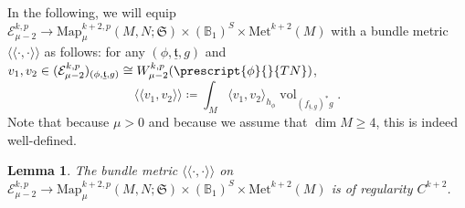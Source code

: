 \documentclass{article}
\numberwithin{equation}{section}        %
\theoremstyle{bfnote}
\newtheorem{lem}[thm]{Lemma}                %
\theoremstyle{definition}
\theoremstyle{bfremark}
\newcommand{\Map}{\mathrm{Map}}             %
\newcommand{\Met}{\mathrm{Met}}             %
\newcommand{\pairl}{\langle \! \langle}     %
\newcommand{\pairr}{\rangle \! \rangle}     %
\DeclareMathOperator{\vol}{vol}                 %
\begin{document}
In the following, we will equip $\mathcal{E}^{k,p}_{\mu-2} \to \Map^{k+2,p}_{\mu}(M,N;\mathfrak{S}) \times (\mathbb{B}_1)^S\times \Met^{k+2}(M)$ with a bundle metric $\pairl \cdot,\cdot \pairr$ as follows: for any $(\phi, \underline{\mathfrak{t}},g)$ and $v_1,v_2 \in (\mathcal{E}^{k,p}_{\mu-2})_{(\phi,\underline{\mathfrak{t}},g)} \cong W^{k,p}_{\mu-2}(\prescript{\phi}{}{TN})$,
\begin{equation*}
    \pairl v_1,v_2 \pairr \coloneqq \int_M \langle v_1,v_2 \rangle_{h_{\phi}} \vol_{(f_{\underline{\mathfrak{t}},g})^*g} . 
\end{equation*}
Note that because $\mu>0$ and because we assume that $\dim M \geq 4$, this is indeed well-defined.


\begin{lem}
    The bundle metric $\pairl \cdot, \cdot \pairr$ on $\mathcal{E}^{k,p}_{\mu-2} \to \Map^{k+2,p}_\mu(M,N;\mathfrak{S})\times (\mathbb{B}_1)^S\times \Met^{k+2}(M)$ is of regularity $C^{k+2}$.
\end{lem}
\end{document}
